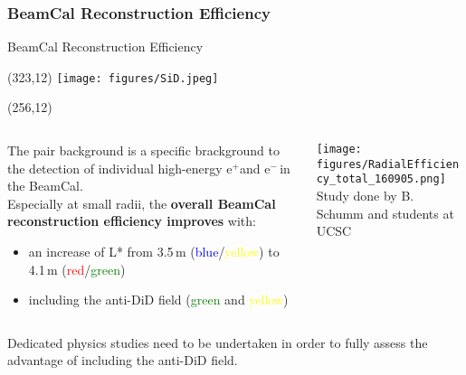 \documentclass[xcolor={dvipsnames}]{beamer}
\newcommand{\sidlogo}{
  \setlength{\TPHorizModule}{1pt}
  \setlength{\TPVertModule}{1pt}
  \begin{textblock}{1}(323,12)
   \texttt{[image: figures/SiD.jpeg]}
  \end{textblock}
  }
\newcommand{\paper}{
  \setlength{\TPHorizModule}{1pt}
  \setlength{\TPVertModule}{1pt}
  \begin{textblock}{65}(256,12)
  \centering
  \textblockcolour{SpringGreen}
  \vspace*{0.8mm}{arXiv:\\1609.07816v1}\vspace*{0.8mm}
  \end{textblock}
}
\newcommand{\electron}{e$^-$}
\newcommand{\positron}{e$^+$}
\begin{document}
\subsubsection{BeamCal Reconstruction Efficiency}
\begin{frame}{BeamCal Reconstruction Efficiency}
\sidlogo
\paper
\begin{columns}
 \begin{column}{0.45\textwidth}
   The pair background is a specific brackground to the detection of individual high-energy \positron and \electron \,in the BeamCal.\\
   Especially at small radii, the \textbf{overall BeamCal reconstruction efficiency improves} with:
   \begin{itemize}
    \item an increase of L* from 3.5\,m (\textcolor{Blue}{blue}/\textcolor{Yellow}{yellow}) to 4.1\,m (\textcolor{Red}{red}/\textcolor{Green}{green})
    \item including the anti-DiD field (\textcolor{Green}{green} and \textcolor{Yellow}{yellow})
   \end{itemize}
 \end{column}
 \begin{column}{0.6\textwidth}
   \texttt{[image: figures/RadialEfficiency\_total\_160905.png]}\\
    {\hfill \tiny Study done by B. Schumm and students at UCSC}
 \end{column}
\end{columns}
\begin{block}{}
 Dedicated physics studies need to be undertaken in order to fully assess the advantage of including the anti-DiD field.
\end{block}
\end{frame}
\end{document}
